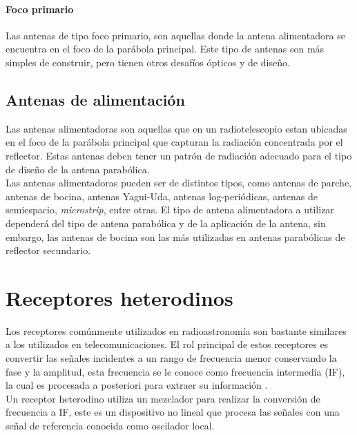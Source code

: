 \paragraph{Foco primario}

Las antenas de tipo foco primario, son aquellas donde la antena alimentadora se encuentra en el foco de la parábola principal. Este tipo de antenas son más simples de construir, pero tienen otros desafíos ópticos y de diseño.\\

\subsection{Antenas de alimentación}

Las antenas alimentadoras son aquellas que en un radiotelescopio estan ubicadas en el foco de la parábola principal que capturan la radiación concentrada por el reflector. Estas antenas deben tener un patrón de radiación adecuado para el tipo de diseño de la antena parabólica.\\

Las antenas alimentadoras pueden ser de distintos tipos, como antenas de parche, antenas de bocina, antenas Yagui-Uda, antenas log-periódicas, antenas de semiespacio, \textit{microstrip}, entre otras. El tipo de antena alimentadora a utilizar dependerá del tipo de antena parabólica y de la aplicación de la antena, sin embargo, las antenas de bocina son las más utilizadas en antenas parabólicas de reflector secundario.\\


\section{Receptores heterodinos}

Los receptores comúnmente utilizados en radioastronomía son bastante similares a los utilizados en telecomunicaciones. El rol principal de estos receptores es convertir las señales incidentes a un rango de frecuencia menor conservando la fase y la amplitud, esta frecuencia se le conoce como frecuencia intermedia (IF), la cual es procesada a posteriori para extraer su información \cite{Finger2013}.\\

Un receptor heterodino utiliza un mezclador para realizar la conversión de frecuencia a IF, este es un dispositivo no lineal que procesa las señales con una señal de referencia conocida como oscilador local.\\


